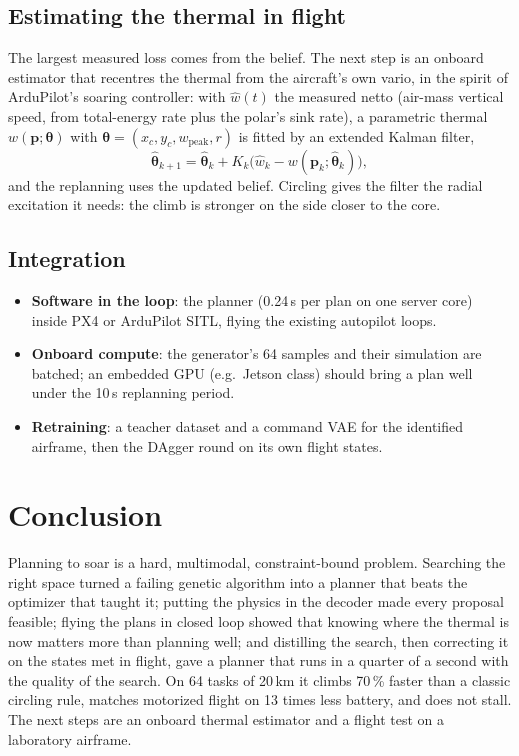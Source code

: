 \documentclass[11pt,a4paper,oneside]{report}
\newcommand{\vect}[1]{\boldsymbol{#1}}
\begin{document}
\section{Estimating the thermal in flight}
The largest measured loss comes from the belief. The next step is an onboard estimator that recentres the thermal from the aircraft's own vario, in the spirit of ArduPilot's soaring controller: with $\hat w(t)$ the measured netto (air-mass vertical speed, from total-energy rate plus the polar's sink rate), a parametric thermal $w(\vect p; \vect\theta)$ with $\vect\theta = (x_c, y_c, w_{\mathrm{peak}}, r)$ is fitted by an extended Kalman filter,
\begin{equation}
\hat{\vect\theta}_{k+1} = \hat{\vect\theta}_k + K_k\big(\hat w_k - w(\vect p_k;\hat{\vect\theta}_k)\big),
\end{equation}
and the replanning uses the updated belief. Circling gives the filter the radial excitation it needs: the climb is stronger on the side closer to the core.

\section{Integration}
\begin{itemize}
  \item \textbf{Software in the loop}: the planner (0.24\,s per plan on one server core) inside PX4 or ArduPilot SITL, flying the existing autopilot loops.
  \item \textbf{Onboard compute}: the generator's 64 samples and their simulation are batched; an embedded GPU (e.g.\ Jetson class) should bring a plan well under the 10\,s replanning period.
  \item \textbf{Retraining}: a teacher dataset and a command VAE for the identified airframe, then the DAgger round on its own flight states.
\end{itemize}

\chapter{Conclusion}\label{ch:conclusion}
Planning to soar is a hard, multimodal, constraint-bound problem. Searching the right space turned a failing genetic algorithm into a planner that beats the optimizer that taught it; putting the physics in the decoder made every proposal feasible; flying the plans in closed loop showed that knowing where the thermal is now matters more than planning well; and distilling the search, then correcting it on the states met in flight, gave a planner that runs in a quarter of a second with the quality of the search. On 64 tasks of 20\,km it climbs 70\,\% faster than a classic circling rule, matches motorized flight on 13 times less battery, and does not stall. The next steps are an onboard thermal estimator and a flight test on a laboratory airframe.
\end{document}
